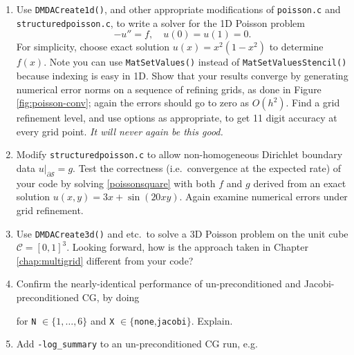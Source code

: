 \renewcommand{\labelenumi}{\arabic{chapter}.\arabic{enumi}\quad}
\begin{enumerate}
\item Use \texttt{DMDACreate1d()}, and other appropriate modifications of \texttt{poisson.c} and \texttt{structuredpoisson.c}, to write a solver for the 1D Poisson problem
    $$-u'' = f, \quad u(0)=u(1)=0.$$
For simplicity, choose exact solution $u(x)=x^2(1-x^2)$ to determine $f(x)$.  Note you can use \texttt{MatSetValues()} instead of \texttt{MatSetValuesStencil()} because indexing is easy in 1D.  Show that your results converge by generating numerical error norms on a sequence of refining grids, as done in Figure \ref{fig:poisson-conv}; again the errors should go to zero as $O(h^2)$.  Find a grid refinement level, and use \pKSP options as appropriate, to get 11 digit accuracy at every grid point.  \emph{It will never again be this good.}
\item Modify \texttt{structuredpoisson.c} to allow non-homogeneous Dirichlet boundary data $u|_{\partial \mathcal{S}}=g$.  Test the correctness (i.e.~convergence at the expected rate) of your code by solving \eqref{poissonsquare} with both $f$ and $g$ derived from an exact solution $u(x,y)=3x + \sin(20xy)$.  Again examine  numerical errors under grid refinement.
\item Use \texttt{DMDACreate3d()} and etc.~to solve a 3D Poisson problem on the unit cube $\mathcal{C}=[0,1]^3$.  Looking forward, how is the approach taken in Chapter \ref{chap:multigrid} different from your code?
\item Confirm the nearly-identical performance of un-preconditioned and Jacobi-preconditioned CG, by doing
for \texttt{N} $\in\{1,\dots,6\}$ and \texttt{X} $\in\{$\texttt{none},\texttt{jacobi}$\}$.  Explain.
\item Add \texttt{-log\_summary} to an un-preconditioned CG run, e.g.

\end{enumerate}
